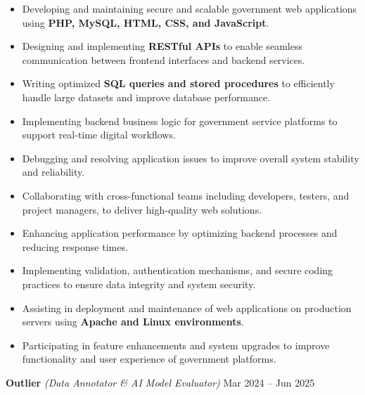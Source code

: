 \documentclass[a4paper,10.9pt]{article}
\begin{document}
\begin{itemize}

\item Developing and maintaining secure and scalable government web applications using \textbf{PHP, MySQL, HTML, CSS, and JavaScript}.

\item Designing and implementing \textbf{RESTful APIs} to enable seamless communication between frontend interfaces and backend services.

\item Writing optimized \textbf{SQL queries and stored procedures} to efficiently handle large datasets and improve database performance.

\item Implementing backend business logic for government service platforms to support real-time digital workflows.

\item Debugging and resolving application issues to improve overall system stability and reliability.

\item Collaborating with cross-functional teams including developers, testers, and project managers, to deliver high-quality web solutions.

\item Enhancing application performance by optimizing backend processes and reducing response times.

\item Implementing validation, authentication mechanisms, and secure coding practices to ensure data integrity and system security.

\item Assisting in deployment and maintenance of web applications on production servers using \textbf{Apache and Linux environments}.

\item Participating in feature enhancements and system upgrades to improve functionality and user experience of government platforms.


\end{itemize}

\vspace{3pt}

{\large\textbf{\color{hdrblue}Outlier}}
\textit{(Data Annotator \& AI Model Evaluator)} \hfill Mar 2024 -- Jun 2025
\end{document}
